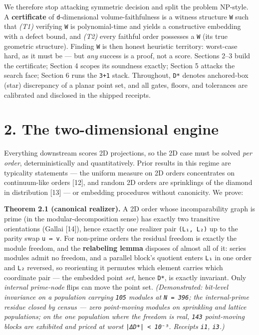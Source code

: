\documentclass[11pt]{article}
\begin{document}
We therefore stop attacking symmetric decision and split the problem NP-style. A \textbf{certificate} of \texttt{d}-dimensional volume-faithfulness is a witness structure \texttt{W} such that \emph{(T1)} verifying \texttt{W} is polynomial-time and yields a constructive embedding with a defect bound, and \emph{(T2)} every faithful order possesses a \texttt{W} (its true geometric structure). Finding \texttt{W} is then honest heuristic territory: worst-case hard, as it must be — but \emph{any} success is a proof, not a score. Sections 2–3 build the certificate; Section 4 scopes its soundness exactly; Section 5 attacks the search face; Section 6 runs the \texttt{3+1} stack. Throughout, \texttt{D*} denotes anchored-box (star) discrepancy of a planar point set, and all gates, floors, and tolerances are calibrated and disclosed in the shipped receipts.

\section*{2. The two-dimensional engine}
Everything downstream scores 2D projections, so the 2D case must be solved \emph{per order}, deterministically and quantitatively. Prior results in this regime are typicality statements — the uniform measure on 2D orders concentrates on continuum-like orders [12], and random 2D orders are sprinklings of the diamond in distribution [13] — or embedding procedures without canonicity. We prove:

\textbf{Theorem 2.1 (canonical realizer).} A 2D order whose incomparability graph is prime (in the modular-decomposition sense) has exactly two transitive orientations (Gallai [14]), hence exactly one realizer pair \texttt{(L₁, L₂)} up to the parity swap \texttt{u ↔ v}. For non-prime orders the residual freedom is exactly the module freedom, and the \textbf{relabeling lemma} disposes of almost all of it: series modules admit no freedom, and a parallel block's quotient enters \texttt{L₁} in one order and \texttt{L₂} reversed, so reorienting it permutes which element carries which coordinate pair — the embedded point \emph{set}, hence \texttt{D*}, is exactly invariant. Only \emph{internal prime-node} flips can move the point set. \emph{(Demonstrated: bit-level invariance on a population carrying \texttt{105} modules at \texttt{N = 396}; the internal-prime residue closed by census — zero point-moving modules on sprinkling and lattice populations; on the one population where the freedom is real, \texttt{143} point-moving blocks are exhibited and priced at worst \texttt{|ΔD*| < 10⁻⁵}. Receipts \texttt{i1}, \texttt{i3}.)}
\end{document}
